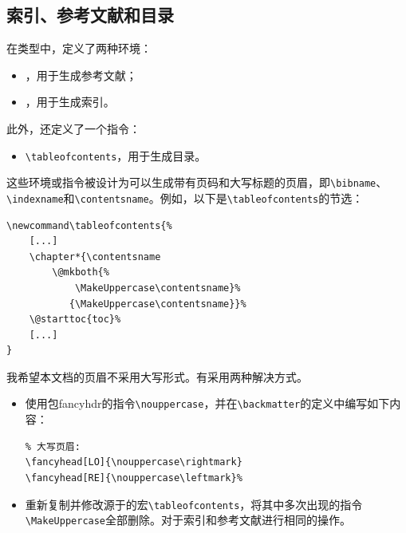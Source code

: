 \subsection{索引、参考文献和目录}

在类型中，定义了两种环境：

\begin{itemize}
    \item {}，用于生成参考文献；
    \item {}，用于生成索引。
\end{itemize}

此外，还定义了一个指令：

\begin{itemize}
    \item \verb|\tableofcontents|，用于生成目录。
\end{itemize}

这些环境或指令被设计为可以生成带有页码和大写标题的页眉，即\verb|\bibname|、\verb|\indexname|和\verb|\contentsname|。例如，以下是\verb|\tableofcontents|的节选：

\begin{dmd}
\begin{verbatim}
\newcommand\tableofcontents{% 
    [...]
    \chapter*{\contentsname 
        \@mkboth{%
            \MakeUppercase\contentsname}% 
           {\MakeUppercase\contentsname}}%
    \@starttoc{toc}% 
    [...]
}\end{verbatim}
\end{dmd}

我希望本文档的页眉不采用大写形式。有采用两种解决方式。

\begin{itemize}
    \item 使用包\textsf{fancyhdr}的指令\verb|\nouppercase|，并在\verb|\backmatter|的定义中编写如下内容：
    \begin{dmd}
    \begin{verbatim}
% 大写页眉: 
\fancyhead[LO]{\nouppercase\rightmark} 
\fancyhead[RE]{\nouppercase\leftmark}%
    \end{verbatim}
    \end{dmd}
    
    \item  重新复制并修改源于的宏\verb|\tableofcontents|，将其中多次出现的指令\verb|\MakeUppercase|全部删除。对于索引和参考文献进行相同的操作。
\end{itemize}

